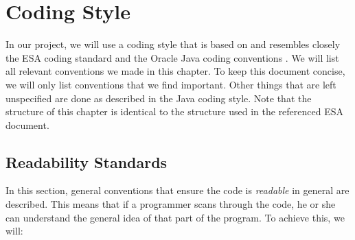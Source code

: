 \chapter{Coding Style}
In our project, we will use a coding style that is based on and resembles closely the ESA coding standard \cite{esa-coding-style} and the Oracle Java coding conventions \cite{oracle-java-coding-style}. We will list all relevant conventions we made in this chapter. To keep this document concise, we will only list conventions that we find important. Other things that are left unspecified are done as described in the Java coding style. Note that the structure of this chapter is identical to the structure used in the referenced ESA document.

\section{Readability Standards}
In this section, general conventions that ensure the code is \emph{readable} in general are described. This means that if a programmer scans through the code, he or she can understand the general idea of that part of the program. To achieve this, we will:

